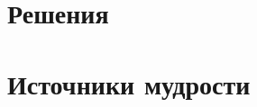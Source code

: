 \documentclass[12pt]{article}
\newcounter{problem}[section]
\theoremstyle{definition}
\begin{document}

\renewenvironment{solution}[1]{%
         \vskip .5cm plus 2cm minus 0.1cm%
         {\bfseries \hyperlink{problem:#1}{#1.}}%
}%
{%
}%

\section{Решения}


\section{Источники мудрости}
\printbibliography[heading=none]
\end{document}
